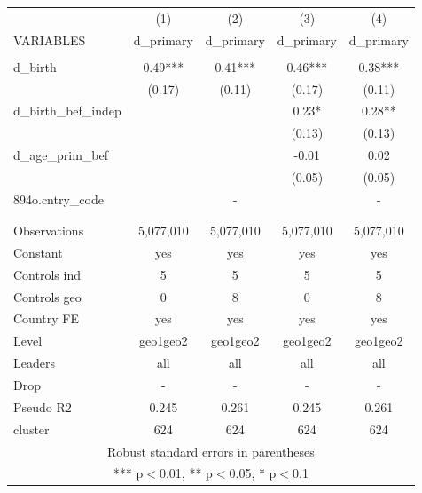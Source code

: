 \documentclass[]{article}
\begin{document}
\begin{tabular}{lcccc} \hline
 & (1) & (2) & (3) & (4) \\
VARIABLES & d\_primary & d\_primary & d\_primary & d\_primary \\ \hline
 &  &  &  &  \\
d\_birth & 0.49*** & 0.41*** & 0.46*** & 0.38*** \\
 & (0.17) & (0.11) & (0.17) & (0.11) \\
d\_birth\_bef\_indep &  &  & 0.23* & 0.28** \\
 &  &  & (0.13) & (0.13) \\
d\_age\_prim\_bef &  &  & -0.01 & 0.02 \\
 &  &  & (0.05) & (0.05) \\
894o.cntry\_code &  & - &  & - \\
 &  &  &  &  \\
 &  &  &  &  \\
Observations & 5,077,010 & 5,077,010 & 5,077,010 & 5,077,010 \\
Constant & yes & yes & yes & yes \\
Controls ind & 5 & 5 & 5 & 5 \\
Controls geo & 0 & 8 & 0 & 8 \\
Country FE & yes & yes & yes & yes \\
Level & geo1geo2 & geo1geo2 & geo1geo2 & geo1geo2 \\
Leaders & all & all & all & all \\
Drop & - & - & - & - \\
Pseudo R2 & 0.245 & 0.261 & 0.245 & 0.261 \\
 cluster & 624 & 624 & 624 & 624 \\ \hline
\multicolumn{5}{c}{ Robust standard errors in parentheses} \\
\multicolumn{5}{c}{ *** p$<$0.01, ** p$<$0.05, * p$<$0.1} \\
\end{tabular}
\end{document}
